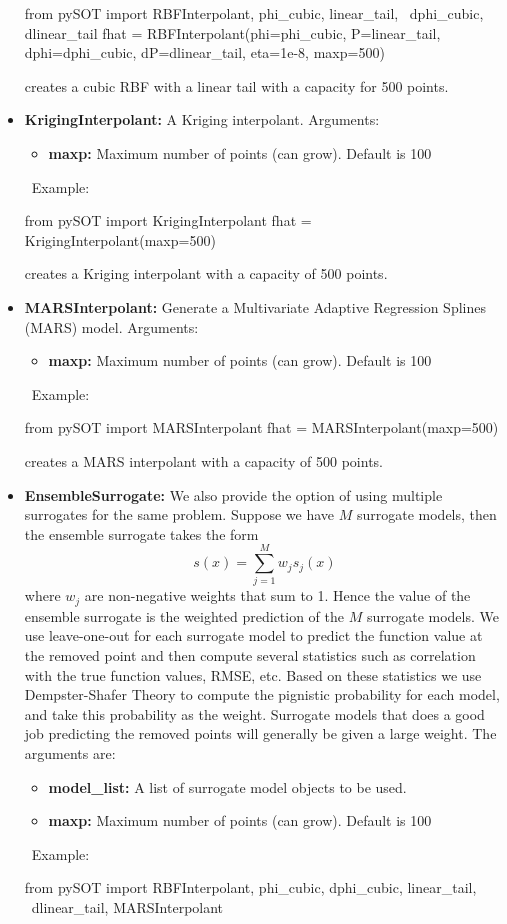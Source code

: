 \documentclass[]{article}
\begin{document}
\begin{itemize}
\begin{python}
from pySOT import RBFInterpolant, phi_cubic, linear_tail, \
	          dphi_cubic, dlinear_tail
fhat = RBFInterpolant(phi=phi_cubic, P=linear_tail, dphi=dphi_cubic, 
               dP=dlinear_tail, eta=1e-8, maxp=500)
\end{python}
creates a cubic RBF with a linear tail with a capacity for 500 points.
\item \textbf{KrigingInterpolant:} A Kriging interpolant. Arguments:
\begin{itemize}
\item \textbf{maxp:} Maximum number of points (can grow). Default is 100
\end{itemize}
\ \newline Example:
\begin{python}
from pySOT import KrigingInterpolant
fhat = KrigingInterpolant(maxp=500)
\end{python}
creates a Kriging interpolant with a capacity of 500 points.
\item \textbf{MARSInterpolant:} Generate a Multivariate Adaptive Regression Splines (MARS) model. Arguments:
\begin{itemize}
\item \textbf{maxp:} Maximum number of points (can grow). Default is 100
\end{itemize}
\ \newline Example: 
\begin{python}
from pySOT import MARSInterpolant
fhat = MARSInterpolant(maxp=500)
\end{python}
creates a MARS interpolant with a capacity of 500 points.
\item \textbf{EnsembleSurrogate:} We also provide the option of using multiple surrogates for the same problem. Suppose we have $M$ surrogate models, then the ensemble surrogate takes the form
\begin{equation*}
s(x) = \sum_{j=1}^M w_j s_j(x)
\end{equation*}
where $w_j$ are non-negative weights that sum to 1. Hence the value of the ensemble surrogate is the weighted prediction of the $M$ surrogate models. We use leave-one-out for each surrogate model to predict the function value at the removed point and then compute several statistics such as correlation with the true function values, RMSE, etc.  Based on these statistics we use Dempster-Shafer Theory to compute the pignistic probability for each model, and take this probability as the weight. Surrogate models that does a good job predicting the removed points will generally be given a large weight. The arguments are:
\begin{itemize}
\item \textbf{model\_list:} A list of surrogate model objects to be used.
\item \textbf{maxp:} Maximum number of points (can grow). Default is 100
\end{itemize}
\ \newline Example: 
\begin{python}
from pySOT import RBFInterpolant, phi_cubic, dphi_cubic, linear_tail, \
        dlinear_tail, MARSInterpolant


\end{python}
\end{itemize}
\end{document}
